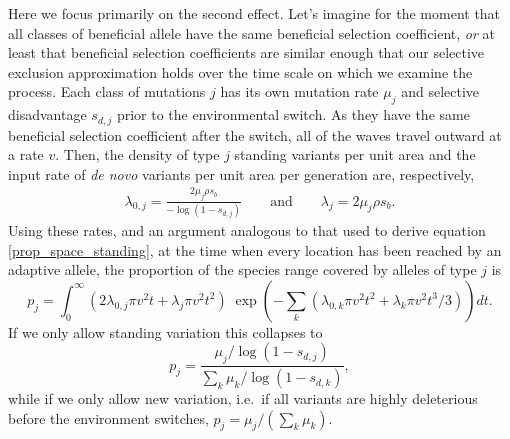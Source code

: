 \documentclass{article}
\newcommand{\gc}[1]{{\it\color{blue} #1} }
\begin{document}
Here we focus primarily on the second effect. 
Let's imagine for the moment that all classes of beneficial allele 
have the same beneficial selection coefficient, \gc{or} at least that beneficial selection coefficients are similar enough that our selective exclusion
approximation holds over the time scale on which we examine the process.
Each class of mutations $j$ has its own mutation rate $\mu_j$ and selective disadvantage $s_{d,j}$ prior to the environmental switch. 
As they have the same beneficial selection coefficient after the switch, 
all of the waves travel outward at a rate $v$. 
Then, the density of type $j$ standing variants per unit area 
and the input rate of \textit{de novo} variants per unit area per generation are, respectively,
\begin{align}
  \lambda_{0,j} = \frac{ 2 \mu_j \rho s_b }{ -\log(1-s_{d,j}) } \qquad \text{and} \qquad    \lambda_{j} = 2 \mu_j \rho s_b .
\end{align}
Using these rates, and an argument analogous to that used to derive
equation \eqref{prop_space_standing},
at the time when every location has been reached by an adaptive allele,
the proportion of the species range covered by alleles of type $j$ is
\begin{equation} \label{eqn-prop-space-allele-j}
    p_j = \int_0^\infty  \left( 2 \lambda_{0,j} \pi v^2 t +  \lambda_j \pi v^2 t^2 \right)  
    \; \exp \left( - \sum_k ( \lambda_{0,k} \pi v^2 t^2 + \lambda_k
      \pi v^2 t^3 / 3 ) \right) dt .  %
\end{equation}
If we only allow standing variation this collapses to 
\begin{equation}  \label{eqn-prop-space-allele-j-standing-room-only}
    p_j = \frac{  \mu_j / \log(1-s_{d,j}) }{\sum_k  \mu_k / \log(1-s_{d,k}) } ,
\end{equation}
while if we only allow new variation, 
i.e.\ if all variants are highly deleterious before the environment switches, 
 $p_j =\mu_j / (\sum_k  \mu_k)$.
\end{document}
